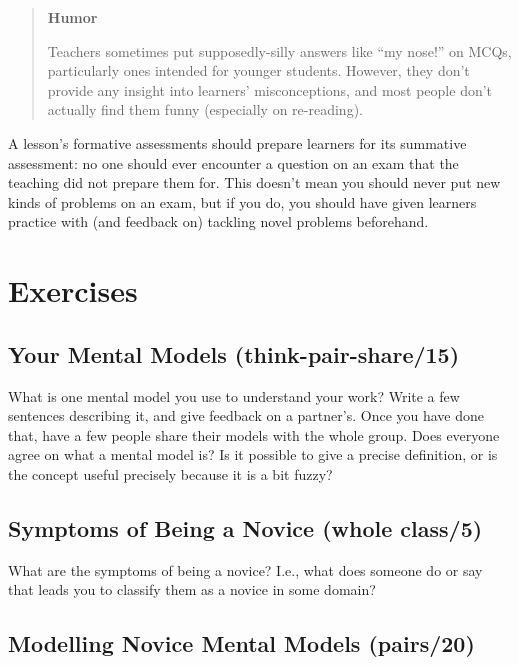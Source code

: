 \begin{quote}\setlength{\parindent}{0pt}
\textbf{Humor}

Teachers sometimes put supposedly-silly answers like ``my nose!'' on
MCQs, particularly ones intended for younger students. However, they
don't provide any insight into learners' misconceptions, and most
people don't actually find them funny (especially on re-reading).
\end{quote}

A lesson's formative assessments should prepare learners for its
summative assessment: no one should ever encounter a question on an exam
that the teaching did not prepare them for. This doesn't mean you should
never put new kinds of problems on an exam, but if you do, you should
have given learners practice with (and feedback on) tackling novel
problems beforehand.

\section{Exercises}\label{s:models-exercises}

\subsection{Your Mental Models (think-pair-share/15)}\label{your-mental-models-think-pair-share15}

What is one mental model you use to understand your work? Write a few
sentences describing it, and give feedback on a partner's. Once you have
done that, have a few people share their models with the whole group.
Does everyone agree on what a mental model is? Is it possible to give a
precise definition, or is the concept useful precisely because it is a
bit fuzzy?

\subsection{Symptoms of Being a Novice (whole class/5)}\label{symptoms-of-being-a-novice-whole-class5}

What are the symptoms of being a novice? I.e., what does someone do or
say that leads you to classify them as a novice in some domain?

\subsection{Modelling Novice Mental Models (pairs/20)}\label{modelling-novice-mental-models-pairs20}

